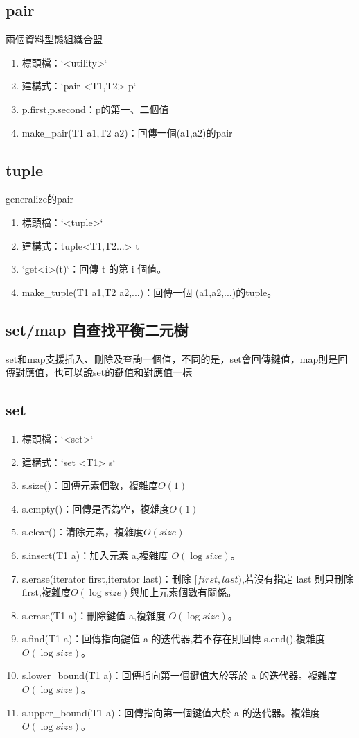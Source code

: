 \subsection{pair} 
兩個資料型態組織合盟
\begin{enumerate}
\item 標頭檔：`<utility>`
\item 建構式：`pair <T1,T2> p`
\item p.first,p.second：p的第一、二個值
\item make\_pair(T1 a1,T2 a2)：回傳一個(a1,a2)的pair
\end{enumerate}
\subsection{tuple} 
generalize的pair
\begin{enumerate}
\item 標頭檔：`<tuple>`
\item 建構式：tuple<T1,T2...> t
\item `get<i>(t)`：回傳 t 的第 i 個值。
\item make\_tuple(T1 a1,T2 a2,...)：回傳一個 (a1,a2,...)的tuple。
\end{enumerate}
\subsection{set/map 自查找平衡二元樹}
set和map支援插入、刪除及查詢一個值，不同的是，set會回傳鍵值，map則是回傳對應值，也可以說set的鍵值和對應值一樣
\subsection{set} 
\begin{enumerate}
\item 標頭檔：`<set>`
\item 建構式：`set <T1> s`
\item s.size()：回傳元素個數，複雜度$O(1)$
\item s.empty()：回傳是否為空，複雜度$O(1)$
\item s.clear()：清除元素，複雜度$O(size)$
\item s.insert(T1 a)：加入元素 a,複雜度 $O(\log size)$。
\item s.erase(iterator first,iterator last)：刪除 $[first,last)$,若沒有指定 last 則只刪除 first,複雜度$O(\log size)$與加上元素個數有關係。
\item s.erase(T1 a)：刪除鍵值 a,複雜度 $O(\log size)$。
\item s.find(T1 a)：回傳指向鍵值 a 的迭代器,若不存在則回傳 s.end(),複雜度 $O(\log size)$。
\item s.lower\_bound(T1 a)：回傳指向第一個鍵值大於等於 a 的迭代器。複雜度 $O(\log size)$。
\item s.upper\_bound(T1 a)：回傳指向第一個鍵值大於 a 的迭代器。複雜度 $O(\log size)$。
\end{enumerate}


